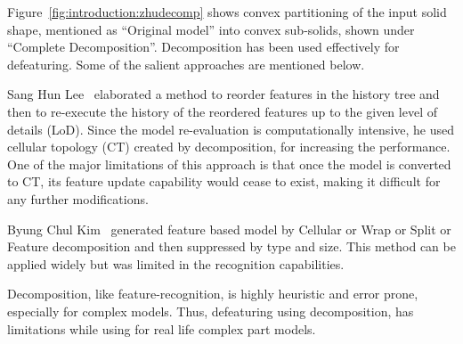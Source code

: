 
Figure~\ref{fig:introduction:zhudecomp} shows convex partitioning of the input solid shape, mentioned as ``Original model'' into convex sub-solids, shown under ``Complete Decomposition''. 
Decomposition has been used effectively for defeaturing. Some of the salient approaches are mentioned below.

Sang Hun Lee~\cite{Lee2005, SangHunLee2005, Lee2009} elaborated a method to reorder features in the history tree and then to re-execute the history of the reordered features up to the given level of details (LoD). Since the model re-evaluation is computationally intensive, he used cellular topology (CT) created by decomposition, for increasing the performance. One of the major limitations of this approach is that once the model is converted to CT, its feature update capability would cease to exist, making it difficult for any further modifications.


Byung Chul Kim~\cite{Kim2014} generated  feature based model by Cellular or Wrap or Split or Feature decomposition and then suppressed by type and size. This method can be applied widely but was limited in the recognition capabilities.

Decomposition, like feature-recognition, is highly heuristic and error prone, especially for complex models. Thus, defeaturing using decomposition, has limitations while using for real life complex part models.


